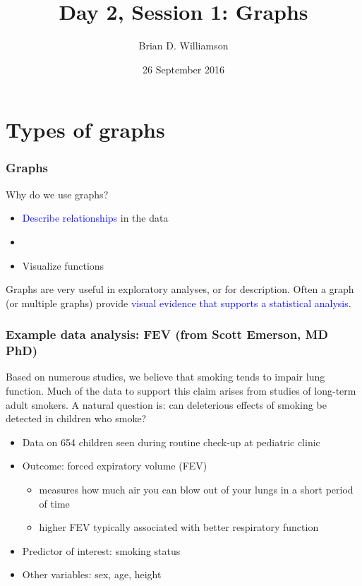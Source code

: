 \documentclass[11pt]{beamer}
\title{Day 2, Session 1: Graphs}
\author{Brian D. Williamson}
\institute{EPI/BIOST Bootcamp 2016}
\date{26 September 2016}
\newcommand{\myframe}[1]{\begin{frame} \frametitle{#1}}
\newenvironment{spaceitemize}
{ \begin{itemize}
    \setlength{\itemsep}{10pt}
    \setlength{\parskip}{0pt}
    \setlength{\parsep}{0pt}     }
{ \end{itemize}                  }
\begin{document}
\begin{frame}
\titlepage
\end{frame}

\section{Types of graphs}
\myframe{Graphs}
Why do we use graphs?
\begin{itemize}
\item \textcolor{blue}{Describe relationships} in the data
\item[]
\item Visualize functions
\end{itemize}

Graphs are very useful in exploratory analyses, or for description. Often a graph (or multiple graphs) provide \textcolor{blue}{visual evidence that supports a statistical analysis}.

\end{frame}

\myframe{Example data analysis: FEV \small (from Scott Emerson, MD PhD)}
Based on numerous studies, we believe that smoking tends to impair lung function. Much of the data to support this claim arises from studies of long-term adult smokers. A natural question is: can deleterious effects of smoking be detected in children who smoke?
\begin{spaceitemize}
\item Data on 654 children seen during routine check-up at pediatric clinic
\item Outcome: forced expiratory volume (FEV)
\begin{itemize}
\item measures how much air you can blow out of your lungs in a short period of time
\item higher FEV typically associated with better respiratory function
\end{itemize}
\item Predictor of interest: smoking status
\item Other variables: sex, age, height
\end{spaceitemize}
\end{frame}
\end{document}
